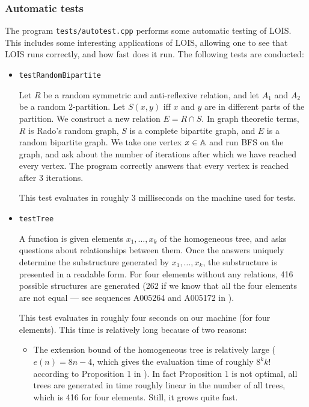 \subsubsection{Automatic tests}

The program \verb-tests/autotest.cpp- performs some automatic testing of LOIS.
This includes some interesting applications of LOIS, allowing
one to see that LOIS runs correctly, and how fast does it run.
The following tests are conducted:

\begin{itemize}
\item \verb-testRandomBipartite-

Let $R$ be a random symmetric
and anti-reflexive relation, and let $A_1$ and $A_2$ be a random 2-partition. Let
$S(x,y)$ iff $x$ and $y$ are in different parts of the partition.
We construct a new relation $E = R \cap S$. In graph theoretic terms,
$R$ is Rado's random graph, $S$ is a complete bipartite graph, and $E$ is a random
bipartite graph. We take one vertex $x \in {\mathbb A}$ and run BFS on the graph, and ask
about the number of iterations after which we have reached every vertex. The program
correctly answers that every vertex is reached after 3 iterations.

This test evaluates in roughly 3 milliseconds on the machine used for tests.

\item \verb-testTree-

A function is given elements
$x_1, \ldots, x_k$ of the homogeneous tree, and asks questions about relationships
between them. Once the answers uniquely determine the substructure generated by
$x_1, \ldots, x_k$, the substructure is presented in a readable form. For four elements
without any relations, 416 possible structures are generated (262 if we know that all
the four elements are not equal --- see sequences A005264 and A005172 in \cite{oeis}).

This test evaluates in roughly four seconds on our machine (for four elements).
This time is relatively long because of two reasons:

\begin{itemize}
\item 
The extension bound of the homogeneous
tree is relatively large ($e(n)=8n-4$, which gives the evaluation time of
roughly $8^k k!$ according to Proposition 1 in %
\cite{lois-sat}). In fact 
Proposition 1 is not optimal, all trees are generated in time
roughly linear in the number of all trees, which is 416 for four elements. Still,
it grows quite fast.


\end{itemize}
\end{itemize}
